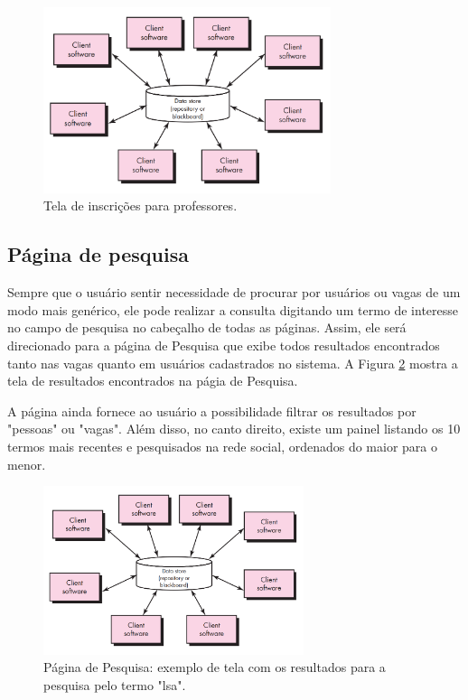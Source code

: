 \documentclass[cic,tc]{iiufrgs}
\begin{document}
\begin{figure}[h]
    \caption{Tela de inscrições para professores.}
        \begin{center}
            \includegraphics[width=0.75\textwidth]{figuras/arquitetura-centralizada-dados.png}
        \end{center}
    \label{telaInscrProf}
\end{figure}

\subsection{Página de pesquisa}
\label{PDVFunPesquisa}

Sempre que o usuário sentir necessidade de procurar por usuários ou vagas de um modo mais genérico, ele pode realizar a consulta digitando um termo de interesse no campo de pesquisa no cabeçalho de todas as páginas. Assim, ele será direcionado para a página de Pesquisa que exibe todos resultados encontrados tanto nas vagas quanto em usuários cadastrados no sistema. A Figura \ref{PDVPesquisaTela} mostra a tela de resultados encontrados na págia de Pesquisa.

A página ainda fornece ao usuário a possibilidade filtrar os resultados por "pessoas" ou "vagas". Além disso, no canto direito, existe um painel listando os 10 termos mais recentes e pesquisados na rede social, ordenados do maior para o menor.

\begin{figure}[ht]
    \caption{Página de Pesquisa: exemplo de tela com os resultados para a pesquisa pelo termo "lsa". }
        \begin{center}
            \includegraphics[width=0.68\textwidth]{arquitetura-centralizada-dados.png}
        \end{center}
    \label{PDVPesquisaTela}
\end{figure}
\end{document}
